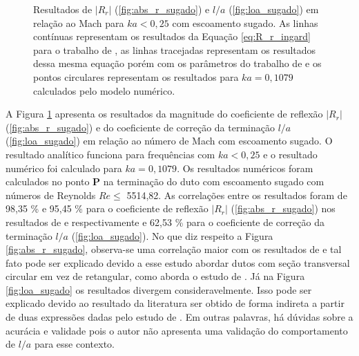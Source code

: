 \begin{figure}[ht!]
\begin{subfigure}{\scaleA \textwidth}
  
\end{subfigure}%
\begin{subfigure}{\scaleA \textwidth}
  
\end{subfigure}
\caption[Resultados de $|R_{r}|$ e $l/a$ em relação ao número de Mach para baixas frequências com escoamento sugado]{Resultados de $|R_{r}|$ (\ref{fig:abs_r_sugado}) e $l/a$ (\ref{fig:loa_sugado}) em relação ao Mach para $ka < 0,25$ com escoamento sugado. As linhas contínuas representam os resultados da Equação \ref{eq:R_r_ingard} para o trabalho de , as linhas tracejadas representam os resultados dessa mesma equação porém com os parâmetros do trabalho de  e os pontos circulares representam os resultados para $ka = 0,1079$ calculados pelo modelo numérico.}
\label{fig:resultados_sugado}
\end{figure}

A Figura \ref{fig:resultados_sugado} apresenta os resultados da magnitude do coeficiente de reflexão $|R_{r}|$ (\ref{fig:abs_r_sugado}) e do coeficiente de correção da terminação $l/a$ (\ref{fig:loa_sugado}) em relação ao número de Mach com escoamento sugado. O resultado analítico funciona para frequências com $ka < 0,25$ e o resultado numérico foi calculado para $ka = 0,1079$. Os resultados numéricos foram calculados no ponto $\textbf{P}$ na terminação do duto com escoamento sugado com números de Reynolds $Re \leq$ 5514,82. As correlações entre os resultados foram de 98,35 \% e 95,45 \% para o coeficiente de reflexão $|R_{r}|$ (\ref{fig:abs_r_sugado}) nos resultados de  e  respectivamente e 62,53 \% para o coeficiente de correção da terminação $l/a$ (\ref{fig:loa_sugado}). No que diz respeito a Figura \ref{fig:abs_r_sugado}, observa-se uma correlação maior com os resultados de  e tal fato pode ser explicado devido a esse estudo abordar dutos com seção transversal circular em vez de retangular, como aborda o estudo de . Já na Figura \ref{fig:loa_sugado} os resultados divergem consideravelmente. Isso pode ser explicado devido ao resultado da literatura ser obtido de forma indireta a partir de duas expressões dadas pelo estudo de . Em outras palavras, há dúvidas sobre a acurácia e validade pois o autor não apresenta uma validação do comportamento de $l/a$ para esse contexto.

